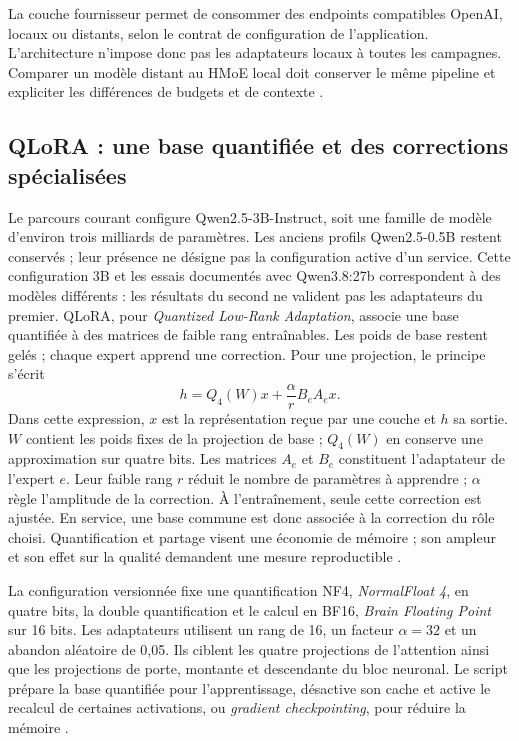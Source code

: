 \documentclass[11pt,a4paper]{article}
\begin{document}
La couche fournisseur permet de consommer des endpoints compatibles
OpenAI, locaux ou distants, selon le contrat de configuration de l'application. L'architecture
n'impose donc pas les adaptateurs locaux à toutes les campagnes. Comparer un
modèle distant au HMoE local doit conserver le même pipeline et expliciter les
différences de budgets et de contexte \cite{arch-provider}.

\subsection{QLoRA : une base quantifiée et des corrections spécialisées}

Le parcours courant configure Qwen2.5-3B-Instruct, soit une famille de modèle
d'environ trois milliards de paramètres. Les anciens profils Qwen2.5-0.5B
restent conservés ; leur présence ne désigne pas la configuration active d'un
service. Cette configuration 3B et les essais documentés avec Qwen3.8:27b
correspondent à des modèles différents : les résultats du second ne valident
pas les adaptateurs du premier. QLoRA, pour \emph{Quantized Low-Rank Adaptation}, associe une base
quantifiée à des matrices de faible rang entraînables. Les poids de base restent
gelés ; chaque expert apprend une correction. Pour une projection, le principe
s'écrit
\[
  h = Q_4(W)x + \frac{\alpha}{r}B_eA_ex.
\]
Dans cette expression, $x$ est la représentation reçue par une couche et $h$
sa sortie. $W$ contient les poids fixes de la projection de base ; $Q_4(W)$
en conserve une approximation sur quatre bits. Les matrices $A_e$ et $B_e$
constituent l'adaptateur de l'expert $e$. Leur faible rang $r$ réduit le nombre
de paramètres à apprendre ; $\alpha$ règle l'amplitude de la correction.
À l'entraînement, seule cette correction est ajustée. En service, une base
commune est donc associée à la correction du rôle choisi. Quantification et
partage visent une économie de mémoire ; son ampleur et son effet sur la
qualité demandent une mesure reproductible \cite{ml-config,ml-train}.

La configuration versionnée fixe une quantification NF4, \emph{NormalFloat 4},
en quatre bits, la double quantification et le calcul en BF16,
\emph{Brain Floating Point} sur 16 bits. Les adaptateurs utilisent un rang
de 16, un facteur $\alpha=32$ et un abandon aléatoire de 0,05. Ils ciblent les
quatre projections de l'attention ainsi que les projections de porte, montante
et descendante du bloc neuronal. Le script prépare la base quantifiée pour
l'apprentissage, désactive son cache et active le recalcul de certaines
activations, ou \emph{gradient checkpointing}, pour réduire la mémoire
\cite{ml-config,ml-train}.
\end{document}
